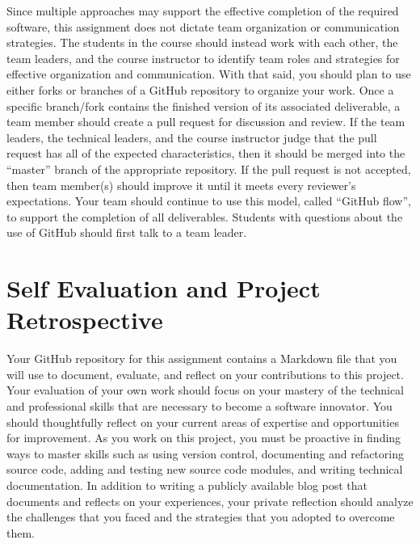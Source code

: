 \documentclass[11pt]{article}
\begin{document}
Since multiple approaches may support the effective completion of the required
software, this assignment does not dictate team organization or communication
strategies. The students in the course should instead work with each other, the
team leaders, and the course instructor to identify team roles and strategies
for effective organization and communication. With that said, you should plan to
use either forks or branches of a GitHub repository to organize your work.
%
Once a specific branch/fork contains the finished version of its associated
deliverable, a team member should create a pull request for discussion and
review. If the team leaders, the technical leaders, and the course instructor
judge that the pull request has all of the expected characteristics, then it
should be merged into the ``master'' branch of the appropriate repository. If
the pull request is not accepted, then team member(s) should improve it until it
meets every reviewer's expectations. Your team should continue to use this
model, called ``GitHub flow'', to support the completion of all deliverables.
%
Students with questions about the use of GitHub should first talk to a team
leader.

\section*{Self Evaluation and Project Retrospective}


Your GitHub repository for this assignment contains a Markdown file that you
will use to document, evaluate, and reflect on your contributions to this
project.
%
Your evaluation of your own work should focus on your mastery of the technical
and professional skills that are necessary to become a software innovator. You
should thoughtfully reflect on your current areas of expertise and opportunities
for improvement. As you work on this project, you must be proactive in finding
ways to master skills such as using version control, documenting and refactoring
source code, adding and testing new source code modules, and writing technical
documentation. In addition to writing a publicly available blog post that
documents and reflects on your experiences, your private reflection should
analyze the challenges that you faced and the strategies that you adopted to
overcome them.

\end{document}
